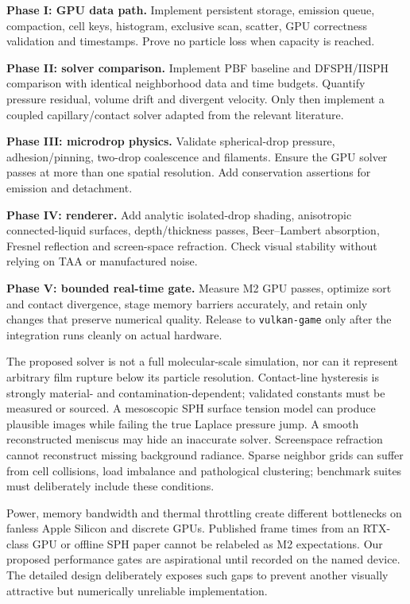\documentclass[10pt,a4paper]{article}
\makeatletter
\renewcommand{\section}{\@startsection{section}{1}{\z@}{1.35ex plus .5ex minus .1ex}{.7ex}{\normalfont\bfseries\normalsize}}
\makeatother
\begin{document}
\textbf{Phase I: GPU data path.} Implement persistent storage, emission queue, compaction, cell keys, histogram, exclusive scan, scatter, GPU correctness validation and timestamps. Prove no particle loss when capacity is reached.

\textbf{Phase II: solver comparison.} Implement PBF baseline and DFSPH/IISPH comparison with identical neighborhood data and time budgets. Quantify pressure residual, volume drift and divergent velocity. Only then implement a coupled capillary/contact solver adapted from the relevant literature.

\textbf{Phase III: microdrop physics.} Validate spherical-drop pressure, adhesion/pinning, two-drop coalescence and filaments. Ensure the GPU solver passes at more than one spatial resolution. Add conservation assertions for emission and detachment.

\textbf{Phase IV: renderer.} Add analytic isolated-drop shading, anisotropic connected-liquid surfaces, depth/thickness passes, Beer--Lambert absorption, Fresnel reflection and screen-space refraction. Check visual stability without relying on TAA or manufactured noise.

\textbf{Phase V: bounded real-time gate.} Measure M2 GPU passes, optimize sort and contact divergence, stage memory barriers accurately, and retain only changes that preserve numerical quality. Release to \texttt{vulkan-game} only after the integration runs cleanly on actual hardware.

\section{Limitations and Threats to Validity}
The proposed solver is not a full molecular-scale simulation, nor can it represent arbitrary film rupture below its particle resolution. Contact-line hysteresis is strongly material- and contamination-dependent; validated constants must be measured or sourced. A mesoscopic SPH surface tension model can produce plausible images while failing the true Laplace pressure jump. A smooth reconstructed meniscus may hide an inaccurate solver. Screenspace refraction cannot reconstruct missing background radiance. Sparse neighbor grids can suffer from cell collisions, load imbalance and pathological clustering; benchmark suites must deliberately include these conditions.

Power, memory bandwidth and thermal throttling create different bottlenecks on fanless Apple Silicon and discrete GPUs. Published frame times from an RTX-class GPU or offline SPH paper cannot be relabeled as M2 expectations. Our proposed performance gates are aspirational until recorded on the named device. The detailed design deliberately exposes such gaps to prevent another visually attractive but numerically unreliable implementation.
\end{document}

